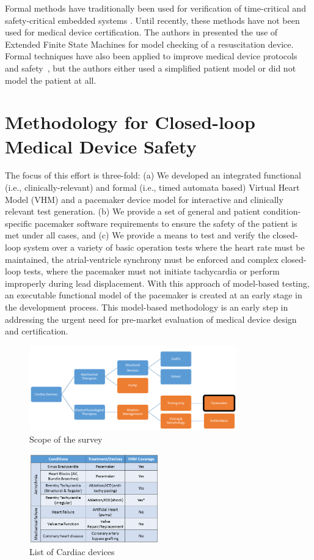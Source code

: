 Formal methods have traditionally been used for verification of time-critical and safety-critical embedded systems \cite{form-meth}. Until recently, these methods have not been used for medical device certification. The authors in \cite{med-form3} presented the use of Extended Finite State Machines for model checking of a resuscitation device. Formal techniques have also been applied to improve medical device protocols~\cite{med-form2} and safety~\cite{med-form1}, but the authors either used a simplified patient model or did not model the patient at all. 

\section{Methodology for Closed-loop Medical Device Safety}
The focus of this effort is three-fold: (a) We developed an integrated functional (i.e., clinically-relevant) and formal (i.e., timed automata based) Virtual Heart Model  (VHM) and a pacemaker device model for interactive and clinically relevant test generation.  (b) We provide a set of general and patient condition-specific pacemaker software requirements to ensure the safety of the patient is met under all cases, and (c) We provide a means to test and verify the closed-loop system over a variety of basic operation tests where the heart rate must be maintained, the atrial-ventricle synchrony must be enforced and complex closed-loop tests, where the pacemaker must not initiate tachycardia or perform improperly during lead displacement. With this approach of model-based testing, an executable functional model of the pacemaker is created at an early stage in the development process. This model-based methodology is an early step in addressing the urgent need for pre-market evaluation of medical device design and certification.
\begin{figure}[!b]
		\centering
		\includegraphics[width=0.8\textwidth]{figs/Fig1.png}
		\caption{\small Scope of the survey}
		\label{fig:scope}
\end{figure}
\begin{figure}[!b]
		\centering
		\includegraphics[width=0.5\textwidth]{figs/devices.png}
		\caption{\small List of Cardiac devices}
		\label{fig:devices}
\end{figure}